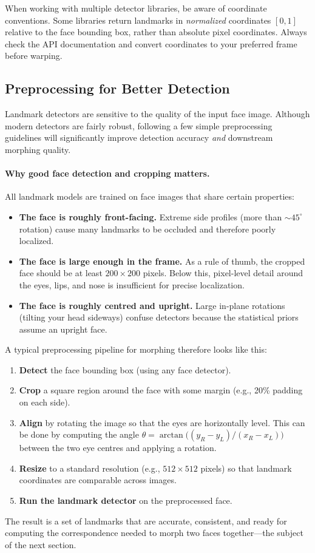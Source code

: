 \begin{remark}
    When working with multiple detector libraries, be aware of coordinate conventions. Some libraries return landmarks in \emph{normalized} coordinates $[0, 1]$ relative to the face bounding box, rather than absolute pixel coordinates. Always check the API documentation and convert coordinates to your preferred frame before warping.
\end{remark}

\subsection{Preprocessing for Better Detection}

Landmark detectors are sensitive to the quality of the input face image. Although modern detectors are fairly robust, following a few simple preprocessing guidelines will significantly improve detection accuracy \emph{and} downstream morphing quality.

\paragraph*{Why good face detection and cropping matters.}

All landmark models are trained on face images that share certain properties:
\begin{itemize}
    \item \textbf{The face is roughly front-facing.} Extreme side profiles (more than $\sim45^\circ$ rotation) cause many landmarks to be occluded and therefore poorly localized.
    \item \textbf{The face is large enough in the frame.} As a rule of thumb, the cropped face should be at least $200 \times 200$ pixels. Below this, pixel-level detail around the eyes, lips, and nose is insufficient for precise localization.
    \item \textbf{The face is roughly centred and upright.} Large in-plane rotations (tilting your head sideways) confuse detectors because the statistical priors assume an upright face.
\end{itemize}

A typical preprocessing pipeline for morphing therefore looks like this:
\begin{enumerate}
    \item \textbf{Detect} the face bounding box (using any face detector).
    \item \textbf{Crop} a square region around the face with some margin (e.g., 20\% padding on each side).
    \item \textbf{Align} by rotating the image so that the eyes are horizontally level. This can be done by computing the angle $\theta = \arctan\!\big((y_R - y_L)/(x_R - x_L)\big)$ between the two eye centres and applying a rotation.
    \item \textbf{Resize} to a standard resolution (e.g., $512 \times 512$ pixels) so that landmark coordinates are comparable across images.
    \item \textbf{Run the landmark detector} on the preprocessed face.
\end{enumerate}

The result is a set of landmarks that are accurate, consistent, and ready for computing the correspondence needed to morph two faces together---the subject of the next section.
